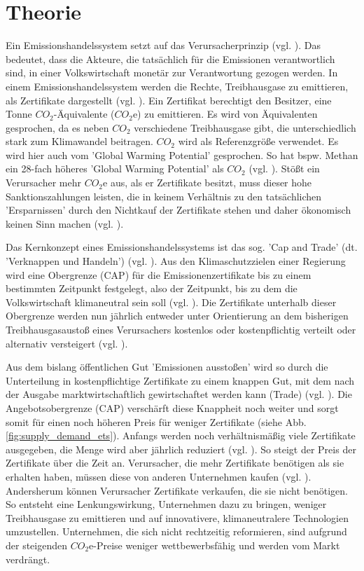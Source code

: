 \chapter{Theorie}

Ein Emissionshandelssystem setzt auf das Verursacherprinzip (vgl. \cite[S. 161]{hubert.2020}).
Das bedeutet, dass die Akteure, die tatsächlich für die Emissionen verantwortlich sind, in einer Volkswirtschaft monetär zur Verantwortung gezogen werden.
In einem Emissionshandelssystem werden die Rechte, Treibhausgase zu emittieren, als Zertifikate dargestellt (vgl. \cite[S. 27]{rabe.2018}).
Ein Zertifikat berechtigt den Besitzer, eine Tonne $CO_2$-Äquivalente ($CO_2$e) zu emittieren.
Es wird von Äquivalenten gesprochen, da es neben $CO_2$ verschiedene Treibhausgase gibt, die unterschiedlich stark zum Klimawandel beitragen. $CO_2$ wird als Referenzgröße verwendet.
Es wird hier auch vom 'Global Warming Potential' gesprochen. So hat bspw. Methan ein 28-fach höheres 'Global Warming Potential' als $CO_2$ (vgl. \cite{ub.2023}).
Stößt ein Verursacher mehr $CO_2$e aus, als er Zertifikate besitzt, muss dieser hohe Sanktionszahlungen leisten, die in keinem Verhältnis zu den tatsächlichen 'Ersparnissen' durch den Nichtkauf der Zertifikate stehen und daher ökonomisch keinen Sinn machen (vgl. \cite[S. 181]{hubert.2020}).

Das Kernkonzept eines Emissionshandelssystems ist das sog. 'Cap and Trade' (dt. 'Verknappen und Handeln') (vgl. \cite[S. 134]{rabe.2018}).
Aus den Klimaschutzzielen einer Regierung wird eine Obergrenze (CAP) für die Emissionenzertifikate bis zu einem bestimmten Zeitpunkt festgelegt, also der Zeitpunkt, bis zu dem die Volkswirtschaft klimaneutral sein soll (vgl. \cite[S. 181]{hubert.2020}).
Die Zertifikate unterhalb dieser Obergrenze werden nun jährlich entweder unter Orientierung an dem bisherigen Treibhausgasaustoß eines Verursachers kostenlos oder kostenpflichtig verteilt oder alternativ versteigert (vgl. \cite[S. 181]{hubert.2020}).

Aus dem bislang öffentlichen Gut 'Emissionen ausstoßen' wird so durch die Unterteilung in kostenpflichtige Zertifikate zu einem knappen Gut, mit dem nach der Ausgabe marktwirtschaftlich gewirtschaftet werden kann (Trade) (vgl. \cite[S. 17]{hubert.2020}).
Die Angebotsobergrenze (CAP) verschärft diese Knappheit noch weiter und sorgt somit für einen noch höheren Preis für weniger Zertifikate (siehe Abb. \ref{fig:supply_demand_ets}).
Anfangs werden noch verhältnismäßig viele Zertifikate ausgegeben, die Menge wird aber jährlich reduziert (vgl. \cite[S. 182]{hubert.2020}). So steigt der Preis der Zertifikate über die Zeit an.
Verursacher, die mehr Zertifikate benötigen als sie erhalten haben, müssen diese von anderen Unternehmen kaufen (vgl. \cite[S. 182]{hubert.2020}).
Andersherum können Verursacher Zertifikate verkaufen, die sie nicht benötigen.
So entsteht eine Lenkungswirkung, Unternehmen dazu zu bringen, weniger Treibhausgase zu emittieren und auf innovativere, klimaneutralere Technologien umzustellen.
Unternehmen, die sich nicht rechtzeitig reformieren, sind aufgrund der steigenden $CO_2$e-Preise weniger wettbewerbsfähig und werden vom Markt verdrängt.

